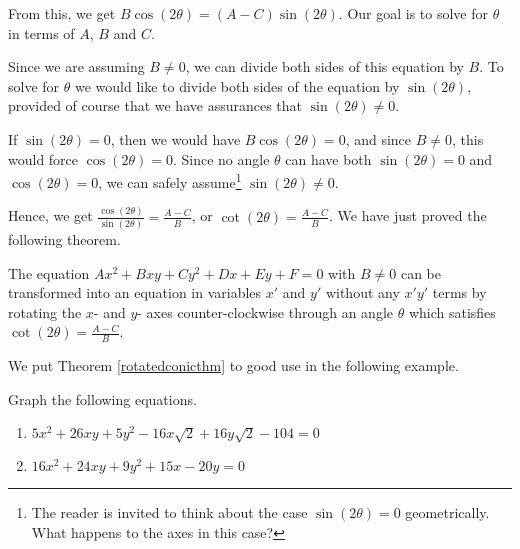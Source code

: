 \documentclass{ximera}
\begin{document}
{From this, we get $B \cos(2\theta) = (A-C)\sin(2\theta)$. Our goal is to solve for $\theta$ in terms of  $A$, $B$ and $C$. 

\smallskip

 Since we are assuming $B \neq 0$, we can divide both sides of this equation by $B$.  To solve for $\theta$ we would like to divide both sides of the equation by $\sin(2\theta)$, provided of course that  we have assurances that $\sin(2\theta) \neq 0$.  
 
 \smallskip
 
 If  $\sin(2\theta) = 0$, then we would have  $B \cos(2\theta) = 0$, and since $B \neq 0$, this would force $\cos(2\theta) = 0$.  Since no angle $\theta$ can have both $\sin(2\theta) = 0$ and $\cos(2\theta) = 0$, we can safely assume\footnote{The reader is invited to think about the case $\sin(2\theta) = 0$ geometrically.  What happens to the axes in this case?} $\sin(2\theta) \neq 0$.  
 
 \smallskip
 
Hence, we get $\frac{\cos(2\theta)}{\sin(2\theta)} = \frac{A-C}{B}$, or $\cot(2\theta) = \frac{A-C}{B}$.  We have just proved the following theorem.

 \smallskip

\begin{theorem} \label{rotatedconicthm}  The equation  $Ax^2 + Bxy +Cy^2 + Dx + Ey + F = 0$ with $B \neq 0$ can be transformed into an equation in variables $x'$ and $y'$ without any $x'y'$ terms by rotating the $x$- and $y$- axes counter-clockwise through an angle $\theta$ which satisfies $\cot(2\theta) = \frac{A-C}{B}$.

\end{theorem}

 \smallskip

We put Theorem \ref{rotatedconicthm} to good use in the following example.

\begin{example} \label{graphrotatedconicex} Graph the following equations.

\begin{enumerate}

\item \label{rotatedhyperbolaex}  $5x^2+26xy+5y^2-16x\sqrt{2}+16y\sqrt{2}-104 = 0$

\item \label{rotatedparabolaex} $16x^2+24xy+9y^2 +15x-20y = 0$

\end{enumerate}


\end{example}}
\end{document}
